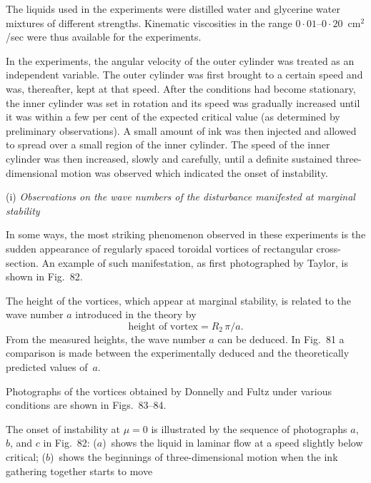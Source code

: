 The liquids used in the experiments were distilled water and glycerine
water mixtures of different strengths.  Kinematic viscosities in the range
$0{\cdot}01$--$0{\cdot}20$~cm$^2$/sec were thus available for the experiments.

In the experiments, the angular velocity of the outer cylinder was
treated as an independent variable.  The outer cylinder was first brought
to a certain speed and was, thereafter, kept at that speed.  After the
conditions had become stationary, the inner cylinder was set in rotation
and its speed was gradually increased until it was within a few per cent of
the expected critical value (as determined by preliminary observations).
A small amount of ink was then injected and allowed to spread over a
small region of the inner cylinder.  The speed of the inner cylinder was
then increased, slowly and carefully, until a definite sustained three-dimensional
motion was observed which indicated the onset of instability.

\medskip
\noindent (i) \textit{Observations on the wave numbers of the disturbance manifested at
marginal stability}

In some ways, the most striking phenomenon observed in these
experiments is the sudden appearance of regularly spaced toroidal
vortices of rectangular cross-section.  An example of such manifestation,
as first photographed by Taylor, is shown in Fig.~82.

The height of the vortices, which appear at marginal stability, is
related to the wave number $a$ introduced in the theory by
\begin{equation}\label{eq:7-335}
\text{height of vortex} = R_2\,\pi/a.
\end{equation}
From the measured heights, the wave number $a$ can be deduced.  In
Fig.~81 a comparison is made between the experimentally deduced and
the theoretically predicted values of~$a$.


Photographs of the vortices obtained by Donnelly and Fultz under
various conditions are shown in Figs.~83--84.

The onset of instability at $\mu = 0$ is illustrated by the sequence of
photographs $a$, $b$, and $c$ in Fig.~82: ($a$)~shows the liquid in laminar flow
at a speed slightly below critical; ($b$)~shows the beginnings of three-dimensional
motion when the ink gathering together starts to move

